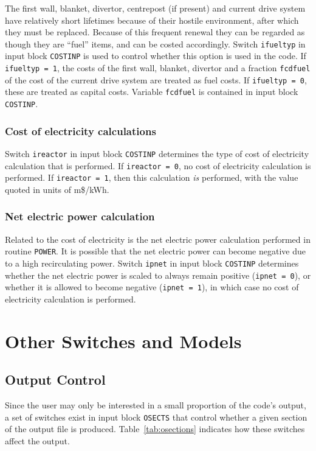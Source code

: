 \documentclass[11pt,a4paper]{report}
\begin{document}
The first wall, blanket, divertor, centrepost (if present) and current drive
system have relatively short lifetimes because of their hostile environment,
after which they must be replaced. Because of this frequent renewal they can
be regarded as though they are ``fuel'' items, and can be costed
accordingly. Switch {\tt ifueltyp} in input block {\tt COSTINP} is used to
control whether this option is used in the code. If {\tt ifueltyp = 1}, the
costs of the first wall, blanket, divertor and a fraction {\tt fcdfuel} of the
cost of the current drive system are treated as fuel costs. If {\tt ifueltyp =
0}, these are treated as capital costs. Variable {\tt fcdfuel} is contained in
input block {\tt COSTINP}.

\subsubsection{Cost of electricity calculations}

Switch {\tt ireactor} in input block {\tt COSTINP} determines the type of cost
of electricity calculation that is performed. If {\tt ireactor = 0}, no cost
of electricity calculation is performed. If {\tt ireactor = 1}, then this
calculation {\em is}\/ performed, with the value quoted in units of
m\$/kWh.

\subsubsection{Net electric power calculation}

Related to the cost of electricity is the net electric power calculation
performed in routine {\tt POWER}. It is possible that the net electric power
can become negative due to a high recirculating power. Switch {\tt ipnet} in
input block {\tt COSTINP} determines whether the net electric power is scaled
to always remain positive ({\tt ipnet = 0}), or whether it is allowed to
become negative ({\tt ipnet = 1}), in which case no cost of electricity
calculation is performed.

\section{Other Switches and Models}

\subsection{Output Control}

Since the user may only be interested in a small proportion of the code's
output, a set of switches exist in input block {\tt OSECTS} that control
whether a given section of the output file is produced.
Table~\ref{tab:osections} indicates how these switches affect the output.
\end{document}
